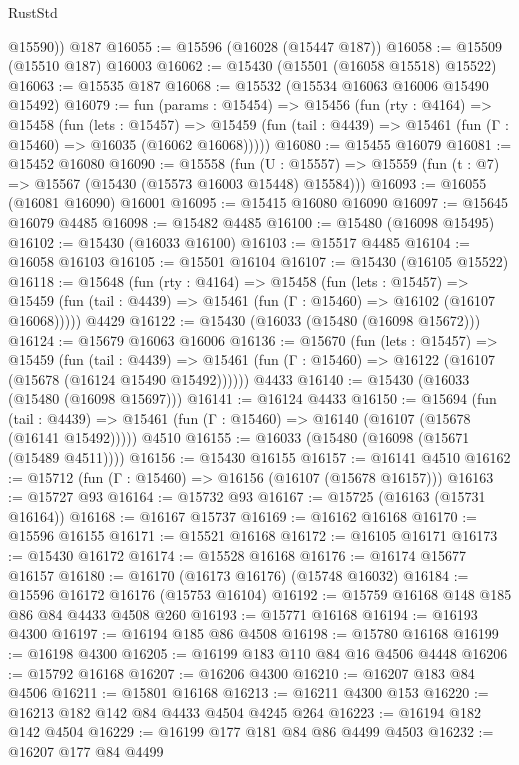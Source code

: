 \begin{lexlean}{RustStd}
\begin{coremodule}
        @15590))
    @187
@16055 := @15596 (@16028 (@15447 @187))
@16058 := @15509 (@15510 @187) @16003
@16062 := @15430 (@15501 (@16058 @15518) @15522)
@16063 := @15535 @187
@16068 := @15532 (@15534 @16063 @16006 @15490 @15492)
@16079 := fun (params : @15454) =>
  @15456
    (fun (rty : @4164) =>
    @15458
      (fun (lets : @15457) =>
      @15459 (fun (tail : @4439) => @15461 (fun (Γ : @15460) => @16035 (@16062 @16068)))))
@16080 := @15455 @16079
@16081 := @15452 @16080
@16090 := @15558
    (fun (U : @15557) => @15559 (fun (t : @7) => @15567 (@15430 (@15573 @16003 @15448) @15584)))
@16093 := @16055 (@16081 @16090) @16001
@16095 := @15415 @16080 @16090
@16097 := @15645 @16079 @4485
@16098 := @15482 @4485
@16100 := @15480 (@16098 @15495)
@16102 := @15430 (@16033 @16100)
@16103 := @15517 @4485
@16104 := @16058 @16103
@16105 := @15501 @16104
@16107 := @15430 (@16105 @15522)
@16118 := @15648
    (fun (rty : @4164) =>
    @15458
      (fun (lets : @15457) =>
      @15459 (fun (tail : @4439) => @15461 (fun (Γ : @15460) => @16102 (@16107 @16068)))))
    @4429
@16122 := @15430 (@16033 (@15480 (@16098 @15672)))
@16124 := @15679 @16063 @16006
@16136 := @15670
    (fun (lets : @15457) =>
    @15459
      (fun (tail : @4439) =>
      @15461 (fun (Γ : @15460) => @16122 (@16107 (@15678 (@16124 @15490 @15492))))))
    @4433
@16140 := @15430 (@16033 (@15480 (@16098 @15697)))
@16141 := @16124 @4433
@16150 := @15694
    (fun (tail : @4439) => @15461 (fun (Γ : @15460) => @16140 (@16107 (@15678 (@16141 @15492)))))
    @4510
@16155 := @16033 (@15480 (@16098 (@15671 (@15489 @4511))))
@16156 := @15430 @16155
@16157 := @16141 @4510
@16162 := @15712 (fun (Γ : @15460) => @16156 (@16107 (@15678 @16157)))
@16163 := @15727 @93
@16164 := @15732 @93
@16167 := @15725 (@16163 (@15731 @16164))
@16168 := @16167 @15737
@16169 := @16162 @16168
@16170 := @15596 @16155
@16171 := @15521 @16168
@16172 := @16105 @16171
@16173 := @15430 @16172
@16174 := @15528 @16168
@16176 := @16174 @15677 @16157
@16180 := @16170 (@16173 @16176) (@15748 @16032)
@16184 := @15596 @16172 @16176 (@15753 @16104)
@16192 := @15759 @16168 @148 @185 @86 @84 @4433 @4508 @260
@16193 := @15771 @16168
@16194 := @16193 @4300
@16197 := @16194 @185 @86 @4508
@16198 := @15780 @16168
@16199 := @16198 @4300
@16205 := @16199 @183 @110 @84 @16 @4506 @4448
@16206 := @15792 @16168
@16207 := @16206 @4300
@16210 := @16207 @183 @84 @4506
@16211 := @15801 @16168
@16213 := @16211 @4300 @153
@16220 := @16213 @182 @142 @84 @4433 @4504 @4245 @264
@16223 := @16194 @182 @142 @4504
@16229 := @16199 @177 @181 @84 @86 @4499 @4503
@16232 := @16207 @177 @84 @4499

\end{coremodule}
\end{lexlean}
